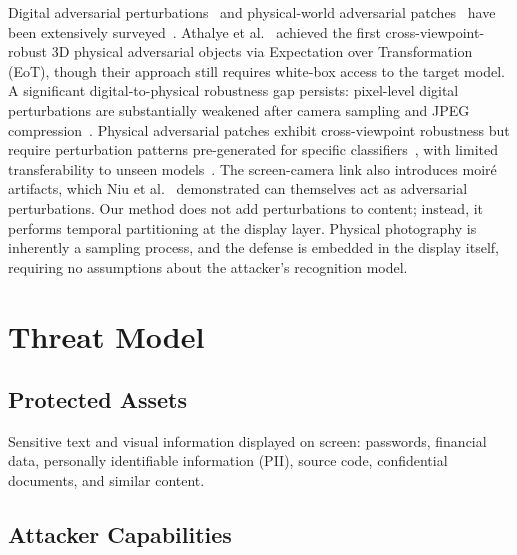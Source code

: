 \documentclass{ieeeaccess}
\begin{document}
Digital adversarial perturbations~\cite{b_goodfellow2015,b_madry2018,b_carlini2017} and physical-world adversarial patches~\cite{b_eykholt2018,b_thys2019,b_xu2020} have been extensively surveyed~\cite{b_wei2024}. Athalye et al.~\cite{b_athalye2018} achieved the first cross-viewpoint-robust 3D physical adversarial objects via Expectation over Transformation (EoT), though their approach still requires white-box access to the target model. A significant digital-to-physical robustness gap persists: pixel-level digital perturbations are substantially weakened after camera sampling and JPEG compression~\cite{b_eykholt2018}. Physical adversarial patches exhibit cross-viewpoint robustness but require perturbation patterns pre-generated for specific classifiers~\cite{b_thys2019,b_xu2020}, with limited transferability to unseen models~\cite{b_zhao2023}. The screen-camera link also introduces moir\'{e} artifacts, which Niu et al.~\cite{b_niu2021} demonstrated can themselves act as adversarial perturbations. Our method does not add perturbations to content; instead, it performs temporal partitioning at the display layer. Physical photography is inherently a sampling process, and the defense is embedded in the display itself, requiring no assumptions about the attacker's recognition model.


\section{Threat Model}
\label{sec:threat}

\subsection{Protected Assets}

Sensitive text and visual information displayed on screen: passwords, financial data, personally identifiable information (PII), source code, confidential documents, and similar content.

\subsection{Attacker Capabilities}
\end{document}
